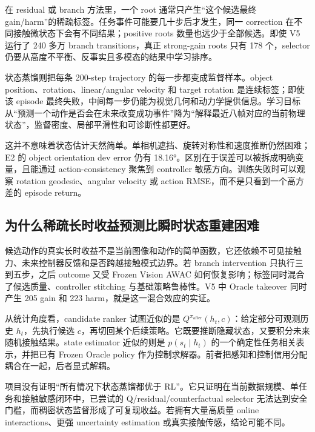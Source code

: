 在 residual 或 branch 方法里，一个 root 通常只产生``这个候选最终 gain/harm''的稀疏标签。任务事件可能要几十步后才发生，同一 correction 在不同接触微状态下会有不同结果；positive roots 数量也远少于全部候选。即使 V5 运行了 240 多万 branch transitions，真正 strong-gain roots 只有 178 个，selector 仍要从高度不平衡、反事实且多模态的结果中学习排序。

状态蒸馏则把每条 200-step trajectory 的每一步都变成监督样本。object position、rotation、linear/angular velocity 和 target rotation 是连续标签；即使该 episode 最终失败，中间每一步仍能为视觉几何和动力学提供信息。学习目标从``预测一个动作是否会在未来改变成功事件''降为``解释最近八帧对应的当前物理状态''，监督密度、局部平滑性和可诊断性都更好。

这并不意味着状态估计天然简单。单相机遮挡、旋转对称性和速度推断仍然困难；E2 的 object orientation dev error 仍有 18.16°。区别在于误差可以被拆成明确变量，且能通过 action-consistency 聚焦到 controller 敏感方向。训练失败时可以观察 rotation geodesic、angular velocity 或 action RMSE，而不是只看到一个高方差的 episode return。

\hypertarget{ux4e3aux4ec0ux4e48ux7a00ux758fux957fux65f6ux6536ux76caux9884ux6d4bux6bd4ux77acux65f6ux72b6ux6001ux91cdux5efaux56f0ux96be}{%
\subsection{为什么稀疏长时收益预测比瞬时状态重建困难}\label{ux4e3aux4ec0ux4e48ux7a00ux758fux957fux65f6ux6536ux76caux9884ux6d4bux6bd4ux77acux65f6ux72b6ux6001ux91cdux5efaux56f0ux96be}}

候选动作的真实长时收益不是当前图像和动作的简单函数，它还依赖不可见接触力、未来控制器反馈和是否跨越接触模式边界。若 branch intervention 只执行三到五步，之后 outcome 又受 Frozen Vision AWAC 如何恢复影响；标签同时混合了候选质量、controller stitching 与基础策略鲁棒性。V5 中 Oracle takeover 同时产生 205 gain 和 223 harm，就是这一混合效应的实证。

从统计角度看，candidate ranker 试图近似的是 \(Q^{\pi_{\text{after}}}(h_t,c)\)：给定部分可观测历史 \(h_t\)，先执行候选 \(c\)，再切回某个后续策略。它既要推断隐藏状态，又要积分未来随机接触结果。state estimator 近似的则是 \(p(s_t\mid h_t)\) 的一个确定性任务相关表示，并把已有 Frozen Oracle policy 作为控制求解器。前者把感知和控制信用分配耦合在一起，后者显式解耦。

项目没有证明``所有情况下状态蒸馏都优于 RL''。它只证明在当前数据规模、单任务和接触敏感闭环中，已尝试的 Q/residual/counterfactual selector 无法达到安全门槛，而稠密状态监督形成了可复现收益。若拥有大量高质量 online interactions、更强 uncertainty estimation 或真实接触传感，结论可能不同。

